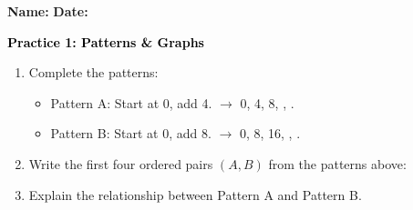 \documentclass[12pt, letterpaper, fleqn]{article}
\newcommand{\blank}{\underline{\hspace{2.2cm}}}
\newcommand{\blanklong}{\underline{\hspace{6.5cm}}}
\begin{document}
\textbf{Name:} \underline{\hspace{5cm}}
\hfill
\textbf{Date:} \underline{\hspace{3cm}}\\

\begin{tcolorbox}[colback=customteal!20]
    \large\textcolor{black}{\textbf{Practice 1: Patterns \& Graphs}}
\end{tcolorbox}
\begin{enumerate}[itemsep=3.5cm, leftmargin=0.6cm]
\item Complete the patterns:
  \begin{itemize}
    \item Pattern A: Start at 0, add 4. $\rightarrow$ 0, 4, 8, \blank, \blank.
    \item Pattern B: Start at 0, add 8. $\rightarrow$ 0, 8, 16, \blank, \blank.
  \end{itemize}
\item Write the first four ordered pairs $(A, B)$ from the patterns above:
\\
\blanklong
\item Explain the relationship between Pattern A and Pattern B.
\end{enumerate}
\end{document}
